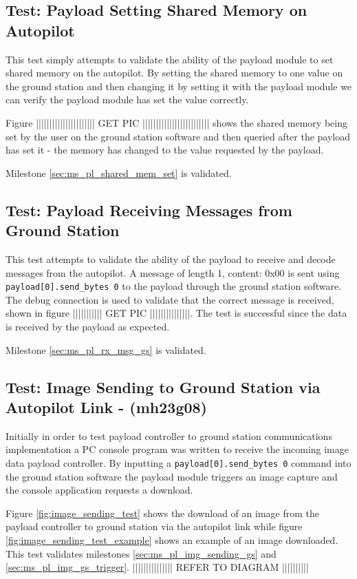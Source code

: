 \subsection{Test: Payload Setting Shared Memory on Autopilot}
\label{sec:test_pl_set_shared_mem}
This test simply attempts to validate the ability of the payload module to set shared memory on 
the autopilot. By setting the shared memory to one value on the ground station and then changing
it by setting it with the payload module we can verify the payload module has set the value correctly.

Figure |||||||||||||||||||||| GET PIC ||||||||||||||||||||||||| shows the shared memory being set by the user
on the ground station software and then queried after the payload has set it - the memory
has changed to the value requested by the payload.

Milestone \ref{sec:ms_pl_shared_mem_set} is validated.

\subsection{Test:  Payload Receiving Messages from Ground Station}
\label{sec:test_pl_receive_message}
This test attempts to validate the ability of the payload to receive and decode messages from the
autopilot. A message of length 1, content: 0x00 is sent using \verb+payload[0].send_bytes 0+ to
the payload through the ground station software. The debug connection is used to validate that the
correct message is received, shown in figure ||||||||||| GET PIC |||||||||||||||. The test is successful
since the data is received by the payload as expected.

Milestone \ref{sec:ms_pl_rx_msg_gs} is validated.

\subsection{Test: Image Sending to Ground Station via Autopilot Link - (mh23g08)}
\label{sec:test_pl_image_send}
Initially in order to test payload controller to ground station communications implementation
a PC console program was written to receive the incoming image data payload controller. By
inputting a \verb+payload[0].send_bytes 0+ command into the ground station software
the payload module triggers an image capture and the console application requests a download.

Figure \ref{fig:image_sending_test} shows the download of an image from the payload controller to
ground station via the autopilot link while figure \ref{fig:image_sending_test_example} shows an example
of an image downloaded. This test validates milestones \ref{sec:ms_pl_img_sending_gs} and \ref{sec:ms_pl_img_gs_trigger}.
||||||||||||||| REFER TO DIAGRAM ||||||||||

